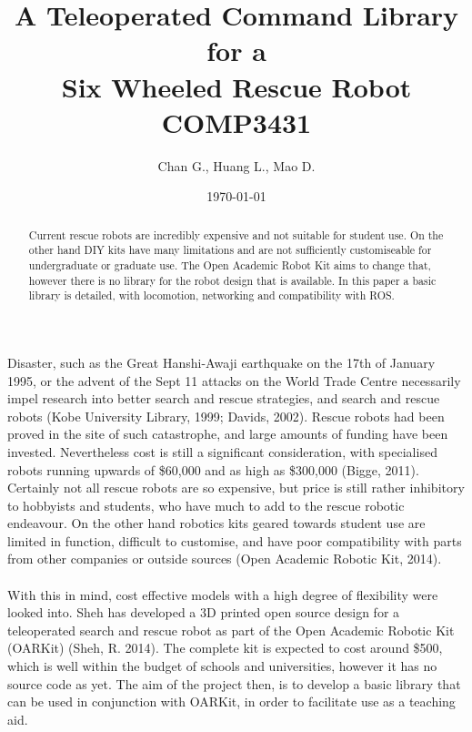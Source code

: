 \documentclass[]{article}
\title{A Teleoperated Command Library for a \\ Six Wheeled Rescue Robot \\ COMP3431}
\author{Chan G., Huang L., Mao D.}
\date{\today}
\begin{document}
\maketitle %

\begin{abstract}
Current rescue robots are incredibly expensive and not suitable for student use. On the other hand DIY kits have many limitations and are not sufficiently customiseable for undergraduate or graduate use. The Open Academic Robot Kit aims to change that, however there is no library for the robot design that is available. In this paper a basic library is detailed, with locomotion, networking and compatibility with ROS.
\end{abstract}

\section{}
Disaster, such as the Great Hanshi-Awaji earthquake on the 17th of January 1995, or the advent of the Sept 11 attacks on the World Trade Centre necessarily impel research into better search and rescue strategies, and search and rescue robots (Kobe University Library, 1999; Davids, 2002). Rescue robots had been proved in the site of such catastrophe, and large amounts of funding have been invested. Nevertheless cost is still a significant consideration, with specialised robots running upwards of \$60,000 and as high as \$300,000 (Bigge, 2011). Certainly not all rescue robots are so expensive, but price is still rather inhibitory to hobbyists and students, who have much to add to the rescue robotic endeavour. On the other hand robotics kits geared towards student use are limited in function, difficult to customise, and have poor compatibility with parts from other companies or outside sources (Open Academic Robotic Kit, 2014).
\\
\\
With this in mind, cost effective models with a high degree of flexibility were looked into. Sheh has developed a 3D printed open source design for a teleoperated search and rescue robot as part of the Open Academic Robotic Kit (OARKit) (Sheh, R. 2014). The complete kit is expected to cost around \$500, which is well within the budget of schools and universities, however it has no source code as yet. The aim of the project then, is to develop a basic library that can be used in conjunction with OARKit, in order to facilitate use as a teaching aid.
\end{document}
